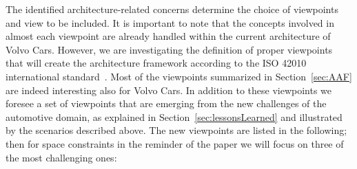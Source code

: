 The identified architecture-related concerns determine the choice of viewpoints and view to be included. 
It is important to note that the concepts involved in almost each viewpoint are already handled within the current architecture of Volvo Cars. However, we are investigating the definition of proper viewpoints that will create the architecture framework according to the ISO 42010 international standard~\cite{42010}. %
Most of the viewpoints summarized in Section~\ref{sec:AAF} are indeed interesting also for Volvo Cars. In addition to these viewpoints we foresee a set of viewpoints that are emerging from the new challenges of the automotive domain, as explained in Section~\ref{sec:lessonsLearned} and illustrated by the scenarios described above. The new viewpoints are listed in the following; then for space constraints in the reminder of the paper we will focus on three of the most challenging ones:

